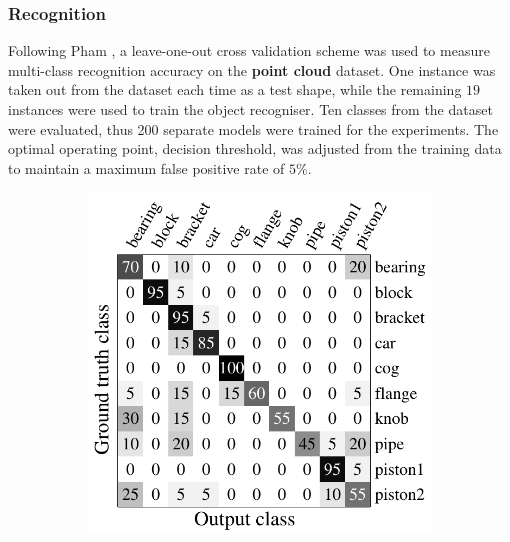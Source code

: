 \subsubsection{Recognition}
Following Pham \etal \cite{Pham2011}, a leave-one-out cross validation scheme was used to measure multi-class recognition accuracy on the \textbf{point cloud} dataset. One instance was taken out from the dataset each time as a test shape, while the remaining $19$ instances were used to train the object recogniser. Ten classes from the dataset were evaluated, thus 200 separate models were trained for the experiments. The optimal operating point, \ie decision threshold, was adjusted from the training data to maintain a maximum false positive rate of $5\%$. 

\begin{figure}[ht]
	\centering
	\begin{subfigure}[t]{0.32\linewidth}
		\label{fig/reg/confusion_sap}
		\includegraphics[width=1\linewidth]{fig/reg/confusion_sap.pdf}
	\end{subfigure}
	\begin{subfigure}[t]{0.32\linewidth}
		\label{fig/reg/confusion_meanshift}

\end{subfigure}
\end{figure}
